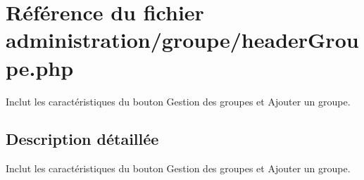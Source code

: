 \hypertarget{headerGroupe_8php}{}\section{Référence du fichier administration/groupe/header\+Groupe.php}
\label{headerGroupe_8php}


Inclut les caractéristiques du bouton Gestion des groupes et Ajouter un groupe.  




\subsection{Description détaillée}
Inclut les caractéristiques du bouton Gestion des groupes et Ajouter un groupe. 

